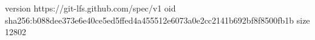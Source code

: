 version https://git-lfs.github.com/spec/v1
oid sha256:b088dee373e6e40ce5ed5ffed4a455512e6073a0e2cc2141b692bf8f8500fb1b
size 12802
